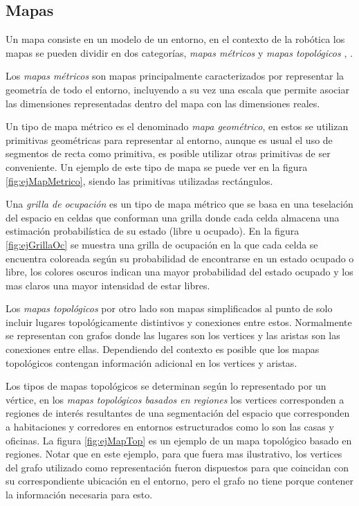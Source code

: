 \subsection{Mapas}\label{subsec:mapas}
Un mapa consiste en un modelo de un entorno, en el contexto de la robótica los mapas se pueden dividir en dos categorías, \emph{mapas métricos} y \emph{mapas topológicos} \cite{Thrun1998}, \cite{choset2005principles}.

Los \emph{mapas métricos} son mapas principalmente caracterizados por representar la geometría de todo el entorno, incluyendo a su vez una escala que permite asociar las dimensiones representadas dentro del mapa con las dimensiones reales.

Un tipo de mapa métrico es el denominado \emph{mapa geométrico}, en estos se utilizan primitivas geométricas para representar al entorno, aunque es usual el uso de segmentos de recta como primitiva, es posible utilizar otras primitivas de ser conveniente. Un ejemplo de este tipo de mapa se puede ver en la figura \ref{fig:ejMapMetrico}, siendo las primitivas utilizadas rectángulos.

Una \emph{grilla de ocupación} es un tipo de mapa métrico que se basa en una teselación del espacio en celdas que conforman una grilla donde cada celda almacena una estimación probabilística de su estado (libre u ocupado). En la figura \ref{fig:ejGrillaOc} se muestra una grilla de ocupación en la que cada celda se encuentra coloreada según su probabilidad de encontrarse en un estado ocupado o libre, los colores oscuros indican una mayor probabilidad del estado ocupado y los mas claros una mayor intensidad de estar libres.

Los \emph{mapas topológicos} por otro lado son mapas simplificados al punto de solo incluir lugares topológicamente distintivos y conexiones entre estos. Normalmente se representan con grafos donde las lugares son los vertices y las aristas son las conexiones entre ellas. Dependiendo del contexto es posible que los mapas topológicos contengan información adicional en los vertices y aristas.

Los tipos de mapas topológicos se determinan según lo representado por un vértice, en los \emph{mapas topológicos basados en regiones} los vertices corresponden a regiones de interés resultantes de una segmentación del espacio que corresponden a habitaciones y corredores en entornos estructurados como lo son las casas y oficinas. La figura \ref{fig:ejMapTop} es un ejemplo de un mapa topológico basado en regiones. Notar que en este ejemplo, para que fuera mas ilustrativo, los vertices del grafo utilizado como representación fueron dispuestos para que coincidan con su correspondiente ubicación en el entorno, pero el grafo no tiene porque contener la información necesaria para esto.

